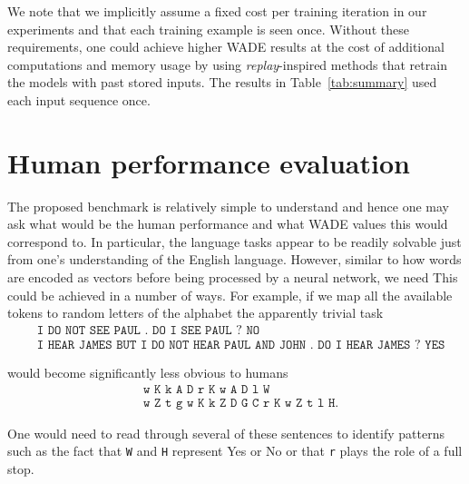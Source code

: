 We note that we implicitly assume a fixed cost per training iteration in our
experiments and that each training example is seen once. Without these
requirements, one could achieve higher WADE results at the cost of additional
computations and memory usage by using \emph{replay}-inspired methods
\parencite{hintonUsingFastWeights1987, robinsCatastrophicForgettingNeural1993a,
  gepperthBioInspiredIncrementalLearning2016,
  rebuffiIcarlIncrementalClassifier2017} that retrain the models with past
stored inputs. The results in Table~\ref{tab:summary} used each input sequence
once.

\section{Human performance evaluation}
\label{sec:human}
The proposed benchmark is relatively simple to understand and hence one may ask
what would be the human performance and what WADE values this would correspond
to. In particular, the language tasks appear to be readily solvable just from
one's understanding of the English language. However, similar to how words are
encoded as vectors before being processed by a neural network, we need This
could be achieved in a number of ways. For example, if we map all the available
tokens to random letters of the alphabet the apparently trivial task
{\small \begin{align*}
          & \texttt{I DO NOT SEE PAUL . DO I SEE PAUL ? NO} \\
          & \texttt{I HEAR JAMES BUT I DO NOT HEAR PAUL AND JOHN . DO I HEAR JAMES ? YES}
\end{align*}}

would become significantly less obvious to humans
{\small
\begin{align*}
  & \texttt{w K k A D r K w A D l W} \\
  & \texttt{w Z t g w K k Z D G C r K w Z t l H}.
\end{align*}
}

One would need to read through several of these sentences to identify patterns
such as the fact that \texttt{W} and \texttt{H} represent Yes or No or that
\texttt{r} plays the role of a full stop.

